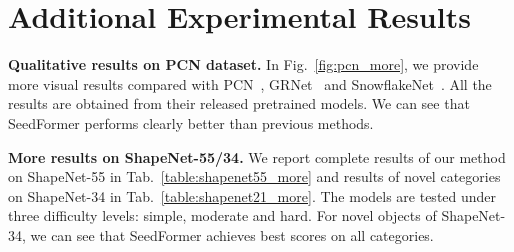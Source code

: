 \section{Additional Experimental Results}
\label{sec:supp:experiment}
\textbf{Qualitative results on PCN dataset.} In Fig.~\ref{fig:pcn_more}, we provide more visual results compared with PCN~\cite{yuan2018pcn}, GRNet~\cite{xie2020grnet} and SnowflakeNet~\cite{xiang2021snowflakenet}. All the results are obtained from their released pretrained models. We can see that SeedFormer performs clearly better than previous methods.

\vspace{5pt}
\noindent\textbf{More results on ShapeNet-55/34.} We report complete results of our method on ShapeNet-55 in Tab.~\ref{table:shapenet55_more} and results of novel categories on ShapeNet-34 in Tab.~\ref{table:shapenet21_more}. The models are tested under three difficulty levels: simple, moderate and hard. For novel objects of ShapeNet-34, we can see that SeedFormer achieves best scores on all categories.


